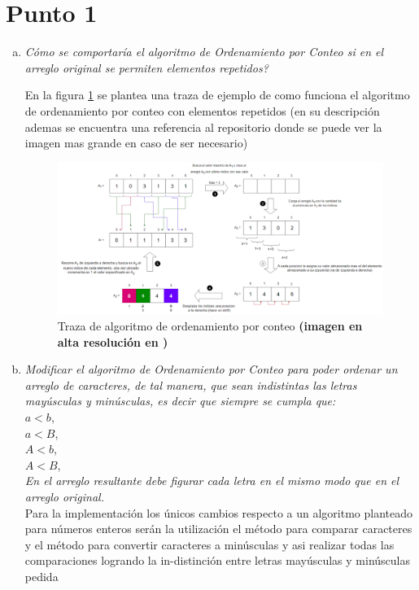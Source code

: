 \section{Punto 1}
\begin{enumerate}[a)]
  \item \textit{Cómo se comportaría el algoritmo de Ordenamiento por Conteo si en el arreglo original se permiten elementos repetidos?}

  En la figura \ref{fig:Traza ordenamiento por conteo} se plantea una traza de ejemplo de como funciona el algoritmo de ordenamiento por conteo con elementos repetidos (en su descripción ademas se encuentra una referencia al repositorio donde se puede ver la imagen mas grande en caso de ser necesario)

  \begin{figure}
    \centering
    \includegraphics[width=\textwidth, scale=1]{Images/Punto1/Traza ordenamiento por conteo.png}
    \caption{Traza de algoritmo de ordenamiento por conteo \textbf{(imagen en alta resolución en \cite{trazaConteo})}}
    \label{fig:Traza ordenamiento por conteo}
  \end{figure}




  \item \textit{Modificar el algoritmo de Ordenamiento por Conteo para poder ordenar un arreglo de caracteres,
  de tal manera, que sean indistintas las letras mayúsculas y minúsculas, es decir que siempre se cumpla
  que:}\\
  $a<b$,\\
  $a<B$,\\
  $A<b$,\\
  $A<B$,\\
  \textit{En el arreglo resultante debe figurar cada letra en el mismo modo que en el arreglo original.}\\

  Para la implementación los únicos cambios respecto a un algoritmo planteado para números enteros serán la utilización el método  para comparar caracteres y el método  para convertir caracteres a minúsculas y asi realizar todas las comparaciones logrando la in-distinción entre letras mayúsculas y minúsculas pedida


\end{enumerate}
